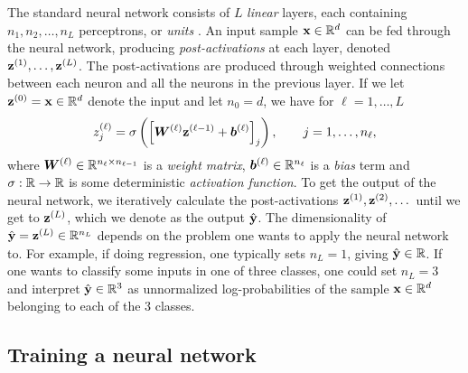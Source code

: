 \documentclass{statsmsc}
\begin{document}
{The standard neural network consists of $L$ \textit{linear} layers, each containing
$n_1,n_2,\dots,n_L$ perceptrons, or \textit{units} \citep{dnn}. An input sample $\mathbf{x} \in \mathbb{R}^d$ can be fed
through the neural network, producing \textit{post-activations} at each layer, denoted
$\mathbf{z}^{(1)}, \dots, \mathbf{z}^{(L)}$. The post-activations are produced through weighted
connections between each neuron and all the neurons in the previous layer. If we let
$\mathbf{z}^{(0)}=\mathbf{x} \in \mathbb{R}^d$ denote the input and let $n_0=d$, we have for $\ell=1,\dots,L$
\begin{equation}\label{eq:nn_update}
    z_j^{(\ell)} = \sigma \left(\left[ \boldsymbol{W}^{(\ell)} \mathbf{z}^{(\ell-1)} + \boldsymbol{b}^{(\ell)} \right]_j \right),\qquad j=1,\dots,n_\ell,
\end{equation}
where $\boldsymbol{W}^{(\ell)} \in \mathbb{R}^{n_{\ell} \times n_{\ell-1}}$ is a \textit{weight matrix},
$\boldsymbol{b}^{(\ell)} \in \mathbb{R}^{n_{\ell}}$ is a \textit{bias} term and
$\sigma : \mathbb{R} \rightarrow {\mathbb{R}}$ is some deterministic \textit{activation function}.
To get the output of the neural network, we iteratively calculate the post-activations
$\mathbf{z}^{(1)},\mathbf{z}^{(2)},\dots$ until we get to $\mathbf{z}^{(L)}$, which we denote as the output
$\hat{\mathbf{y}}$. The dimensionality of $\hat{\mathbf{y}}=\mathbf{z}^{(L)} \in \mathbb{R}^{n_L}$
depends on the problem one wants
to apply the neural network to. For example, if doing regression, one typically sets
$n_L=1$, giving $\hat{\mathbf{y}} \in \mathbb{R}$. If one wants to classify some inputs in one of three classes,
one could set $n_L=3$ and interpret $\hat{\mathbf{y}} \in \mathbb{R}^3$ as unnormalized log-probabilities of
the sample $\mathbf{x} \in \mathbb{R}^d$ belonging to each of the 3 classes.

\subsection{Training a neural network}%
\label{sub:Training a neural network}

}
\end{document}

